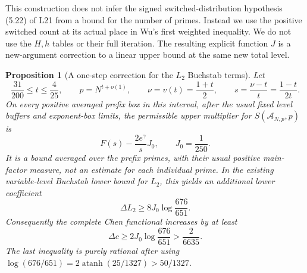 \documentclass[11pt]{article}
\newtheorem{proposition}[theorem]{Proposition}
\begin{document}
This construction does not infer the signed switched-distribution
hypothesis (5.22) of L21 from a bound for the number of primes. Instead
we use the positive switched count at its actual place in Wu's first
weighted inequality. We do not use the $H,h$ tables or their full
iteration. The resulting explicit function $J$ is a new-argument
correction to a linear upper bound at the same new total level.

\begin{proposition}[A one-step correction for the $L_2$ Buchstab terms]
\label{prop:same-new-level-one-step}
Let
\[
 \frac{31}{200}\le t\le\frac4{25},\qquad
 p=N^{t+o(1)},\qquad \nu=v(t)=\frac{1+t}{2},\qquad
 s=\frac{\nu-t}{t}=\frac{1-t}{2t}.
\]
On every positive averaged prefix box in this interval, after the
usual fixed level buffers and exponent-box limits, the permissible
upper multiplier for $S(\mathcal A_{N,p},p)$ is
\begin{equation}\label{eq:same-new-one-step-upper}
 F(s)-\frac{2e^\gamma}{s}J_0,\qquad J_0=\frac1{250}.
\end{equation}
It is a bound averaged over the prefix primes, with their usual
positive main-factor measure, not an estimate for each individual
prime. In the existing variable-level Buchstab lower bound for $L_2$,
this yields an additional lower coefficient
\begin{equation}\label{eq:same-new-one-step-L2}
 \Delta L_2\ge8J_0\log\frac{676}{651}.
\end{equation}
Consequently the complete Chen functional increases by at least
\begin{equation}\label{eq:same-new-one-step-Chen}
 \Delta c\ge2J_0\log\frac{676}{651}>
 \frac2{6635}.
\end{equation}
The last inequality is purely rational after using
$\log(676/651)=2\operatorname{atanh}(25/1327)>50/1327$.
\end{proposition}
\end{document}
